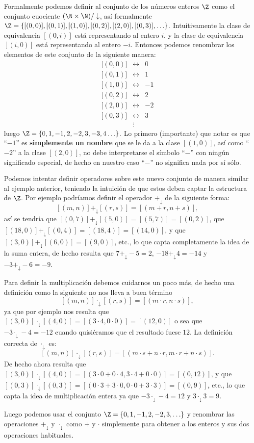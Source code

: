 \begin{ejemplo}
Formalmente podemos definir al conjunto de los números enteros $\Z$ como el conjunto cuociente $(\N\times\N)/\downarrow$, así formalmente $\Z=\{[(0,0)],[(0,1)],[(1,0)],[(0,2)],[(2,0)],[(0,3)],\ldots\}$.
Intuitivamente la clase de equivalencia $[(0,i)]$ está representando al entero $i$, y la clase de equivalencia $[(i,0)]$ está representando al entero $-i$.
Entonces podemos renombrar los elementos de este conjunto de la siguiente manera:
\[
\begin{array}{ccr}
\text{[}(0,0)]&\leftrightarrow&0\\
\text{[}(0,1)]&\leftrightarrow&1\\
\text{[}(1,0)]&\leftrightarrow&-1\\
\text{[}(0,2)]&\leftrightarrow&2\\
\text{[}(2,0)]&\leftrightarrow&-2\\
\text{[}(0,3)]&\leftrightarrow&3\\
&\vdots
\end{array}
\]
luego $\Z=\{0,1,-1,2,-2,3,-3,4\ldots\}$.
Lo primero (importante) que notar es que ``$-1$'' es {\bf simplemente un nombre} que se le da a la clase $[(1,0)]$, así como ``$-2$'' a la clase $[(2,0)]$, no debe interpretarse el símbolo ``$-$'' con ningún significado especial, de hecho en nuestro caso ``$-$'' no significa nada por sí sólo.

Podemos intentar definir operadores sobre este nuevo conjunto de manera similar al ejemplo anterior, teniendo la intuición de que estos deben captar la estructura de $\Z$.
Por ejemplo podríamos definir el operador $+_\downarrow$ de la siguiente forma:
\[
[(m,n)]+_\downarrow[(r,s)]=[(m+r,n+s)],
\]
así se tendría que $[(0,7)]+_\downarrow[(5,0)]=[(5,7)]=[(0,2)]$, que $[(18,0)]+_\downarrow[(0,4)]=[(18,4)]=[(14,0)]$, y que $[(3,0)]+_\downarrow[(6,0)]=[(9,0)]$, etc.,
lo que capta completamente la idea de la suma entera, de hecho resulta que $7+_\downarrow-5=2$, $-18+_\downarrow 4=-14$ y $-3+_\downarrow-6=-9$.

Para definir la multiplicación debemos cuidarnos un poco más, de hecho una definición como la siguiente no nos lleva a buen término
\[
[(m,n)]\cdot_\downarrow[(r,s)]=[(m\cdot r,n\cdot s)],
\]
ya que por ejemplo nos resulta que $[(3,0)]\cdot_\downarrow[(4,0)]=[(3\cdot 4,0\cdot 0)]=[(12,0)]$ o sea que $-3\cdot_\downarrow-4=-12$ cuando quisiéramos que el resultado fuese $12$.
La definición correcta de $\cdot_\downarrow$ es:
\[
[(m,n)]\cdot_\downarrow[(r,s)]=[(m\cdot s+n\cdot r,m\cdot r+n\cdot s)].
\]
De hecho ahora resulta que $[(3,0)]\cdot_\downarrow[(4,0)]=[(3\cdot 0+0\cdot 4,3\cdot 4+0\cdot 0)]=[(0,12)]$, y que $[(0,3)]\cdot_\downarrow[(0,3)]=[(0\cdot 3+3\cdot 0,0\cdot 0+3\cdot 3)]=[(0,9)]$, etc., lo que capta la idea de multiplicación entera ya que $-3\cdot_\downarrow-4=12$ y $3\cdot_\downarrow 3=9$.

Luego podemos usar el conjunto $\Z=\{0,1,-1,2,-2,3,\ldots\}$ y renombrar las operaciones $+_\downarrow$ y $\cdot_\downarrow$ como $+$ y $\cdot$ simplemente para obtener a los enteros y sus dos operaciones habituales.
\end{ejemplo}

